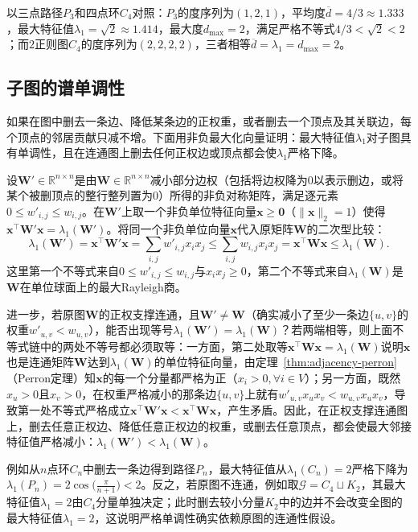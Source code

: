 以三点路径$P_3$和四点环$C_4$对照：$P_3$的度序列为$(1,2,1)$，平均度$\overline d=4/3\approx 1.333$，最大特征值$\lambda_1=\sqrt 2\approx 1.414$，最大度$d_{\max}=2$，满足严格不等式$4/3<\sqrt 2<2$；而$2$正则图$C_4$的度序列为$(2,2,2,2)$，三者相等$\overline d=\lambda_1=d_{\max}=2$。

\subsection{子图的谱单调性}
\label{sec:adjacency-spectral-monotonicity}

如果在图中删去一条边、降低某条边的正权重，或者删去一个顶点及其关联边，每个顶点的邻居贡献只减不增。下面用非负最大化向量证明：最大特征值$\lambda_1$对子图具有单调性，且在连通图上删去任何正权边或顶点都会使$\lambda_1$严格下降。

设$\bm W'\in\mathbb R^{n\times n}$是由$\bm W\in\mathbb R^{n\times n}$减小部分边权（包括将边权降为$0$以表示删边，或将某个被删顶点的整行整列置为$0$）所得的非负对称矩阵，满足逐元素$0\leq w'_{i,j}\leq w_{i,j}$。在$\bm W'$上取一个非负单位特征向量$\bm x\geq\bm 0$（$\|\bm x\|_2=1$）使得$\bm x^\top\bm W'\bm x=\lambda_1(\bm W')$。将同一个非负单位向量$\bm x$代入原矩阵$\bm W$的二次型比较：
\[
\lambda_1(\bm W')
=\bm x^\top\bm W'\bm x
=\sum_{i,j}w'_{i,j}x_i x_j
\leq\sum_{i,j}w_{i,j}x_i x_j
=\bm x^\top\bm W\bm x
\leq\lambda_1(\bm W).
\]
这里第一个不等式来自$0\leq w'_{i,j}\leq w_{i,j}$与$x_i x_j\geq 0$，第二个不等式来自$\lambda_1(\bm W)$是$\bm W$在单位球面上的最大Rayleigh商。

进一步，若原图$\bm W$的正权支撑连通，且$\bm W'\neq\bm W$（确实减小了至少一条边$\{u,v\}$的权重$w'_{u,v}<w_{u,v}$），能否出现等号$\lambda_1(\bm W')=\lambda_1(\bm W)$？若两端相等，则上面不等式链中的两处不等号都必须取等：一方面，第二处取等$\bm x^\top\bm W\bm x=\lambda_1(\bm W)$说明$\bm x$也是连通矩阵$\bm W$达到$\lambda_1(\bm W)$的单位特征向量，由定理~\ref{thm:adjacency-perron}（Perron定理）知$\bm x$的每一个分量都严格为正（$x_i>0,\forall i\in V$）；另一方面，既然$x_u>0$且$x_v>0$，在权重严格减小的那条边$\{u,v\}$上就有$w'_{u,v}x_u x_v<w_{u,v}x_u x_v$，导致第一处不等式严格成立$\bm x^\top\bm W'\bm x<\bm x^\top\bm W\bm x$，产生矛盾。因此，在正权支撑连通图上，删去任意正权边、降低任意正权边的权重，或删去任意顶点，都会使最大邻接特征值严格减小：$\lambda_1(\bm W')<\lambda_1(\bm W)$。

例如从$n$点环$C_n$中删去一条边得到路径$P_n$，最大特征值从$\lambda_1(C_n)=2$严格下降为$\lambda_1(P_n)=2\cos\bigl(\frac{\pi}{n+1}\bigr)<2$。反之，若原图不连通，例如取$\mathcal G=C_4\sqcup K_2$，其最大特征值$\lambda_1=2$由$C_4$分量单独决定；此时删去较小分量$K_2$中的边并不会改变全图的最大特征值$\lambda_1=2$，这说明严格单调性确实依赖原图的连通性假设。

